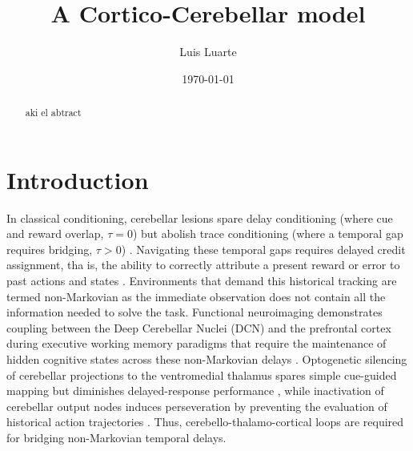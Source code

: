 \documentclass[12pt, a4paper]{extarticle}
\title{A Cortico-Cerebellar model}
\author{Luis Luarte}
\date{\today}
\begin{document}
\maketitle

\begin{abstract}
    aki el abtract
\end{abstract}
	
		\section{Introduction}
	
	In classical conditioning, cerebellar lesions spare delay conditioning (where cue and reward overlap, $\tau = 0$) but abolish trace conditioning (where a temporal gap requires bridging, $\tau > 0$) \parencite{kalmbach2009interactions}. Navigating these temporal gaps requires delayed credit assignment, tha is, the ability to correctly attribute a present reward or error to past actions and states \parencite{suttonReinforcementLearningIntroduction2018}. Environments that demand this historical tracking are termed non-Markovian as the immediate observation does not contain all the information needed to solve the task. Functional neuroimaging demonstrates coupling between the Deep Cerebellar Nuclei (DCN) and the prefrontal cortex during executive working memory paradigms that require the maintenance of hidden cognitive states across these non-Markovian delays \parencite{habasDistinctCerebellarContributions2009, bucknerOrganizationHumanCerebellum2011}. Optogenetic silencing of cerebellar projections to the ventromedial thalamus spares simple cue-guided mapping but diminishes delayed-response performance \parencite{gaoCorticocerebellarLoopMotor2018}, while inactivation of cerebellar output nodes induces perseveration by preventing the evaluation of historical action trajectories \parencite{verpeutCerebellarContributionsBrainwide2023}. Thus, cerebello-thalamo-cortical loops are required for bridging non-Markovian temporal delays.
	
\end{document}
